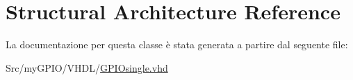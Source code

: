 \hypertarget{class_g_p_i_osingle_1_1_structural}{\section{Structural Architecture Reference}
\label{class_g_p_i_osingle_1_1_structural}
}


La documentazione per questa classe è stata generata a partire dal seguente file\+:\begin{DoxyCompactItemize}
\item 
Src/my\+G\+P\+I\+O/\+V\+H\+D\+L/\hyperlink{_g_p_i_osingle_8vhd}{G\+P\+I\+Osingle.\+vhd}\end{DoxyCompactItemize}
